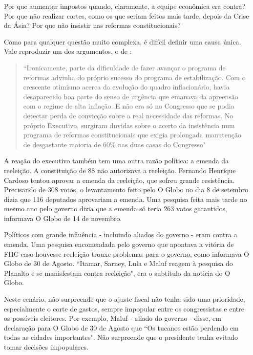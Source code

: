 \documentclass{article}
\begin{document}
Por que aumentar impostos quando, claramente, a equipe econômica era contra? Por que não realizar cortes, como os que seriam feitos mais tarde, depois da Crise da Ásia? Por que não insistir nas reformas constitucionais?

Como para qualquer questão muito complexa, é difícil definir uma causa única. Vale reproduzir um dos argumentos, o de \citet[p. 341]{Werneck2014}:

\begin{quote}
``Ironicamente, parte da dificuldade de fazer avançar o programa de reformas advinha do próprio sucesso do programa de estabilização. Com o crescente otimismo acerca da evolução do quadro inflacionário, havia desaparecido boa parte do senso de urgência que emanava da apreensão com o regime de alta inflação. E não era só no Congresso que se podia detectar perda de convicção sobre a real necessidade das reformas. No próprio Executivo, surgiram duvidas sobre o acerto da insistência num programa de reformas constitucionais que exigia prolongada manutenção de desgastante maioria de 60\% nas duas casas do Congresso"
\end{quote} 

A reação do executivo também tem uma outra razão política: a emenda da reeleição. A constituição de 88 não autorizava a reeleição. Fernando Henrique Cardoso tentou aprovar a emenda da reeleição, que sofreu grande resistência. Precisando de 308 votos, o levantamento feito pelo O Globo no dia 8 de setembro dizia que 116 deputados aprovariam a emenda. Uma pesquisa feita mais tarde no mesmo ano pelo governo dizia que a emenda só teria 263 votos garantidos, informava O Globo de 14 de novembro.

Políticos com grande influência - incluindo aliados do governo - eram contra a emenda. Uma pesquisa encomendada pelo governo que apontava a vitória de FHC caso houvesse reeleição trouxe problemas para o governo, como informava O Globo de 30 de Agosto. ``Itamar, Sarney, Lula e Maluf reagem à pesquisa do Planalto e se manisfestam contra reeleição", era o subtítulo da noticia do O Globo.

Neste cenário, não surpreende que o ajuste fiscal não tenha sido uma prioridade, especialmente o corte de gastos, sempre impopular entre os congressistas e entre os possíveis eleitores. Por exemplo, Maluf - aliado do governo - disse, em declaração para O Globo de 30 de Agosto que ``Os tucanos estão perdendo em todas as cidades importantes". Não surpreende que o presidente tenha evitado tomar decisões impopulares.
\end{document}
